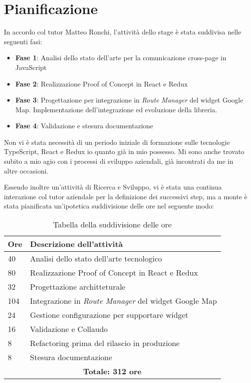 \section{Pianificazione}

In accordo col tutor Matteo Ronchi, l'attività dello stage è stata suddivisa nelle seguenti fasi:

\begin{itemize}
    \item \textbf{Fase 1}: Analisi dello stato dell'arte per la comunicazione cross-page in JavaScript
    \item \textbf{Fase 2}: Realizzazione Proof of Concept in React e Redux
    \item \textbf{Fase 3}: Progettazione per integrazione in \textit{Route Manager} del widget Google Map. Implementazione dell'integrazione ed evoluzione della libreria.
    \item \textbf{Fase 4}: Validazione e stesura documentazione
\end{itemize}

Non vi è stata necessità di un periodo iniziale di formazione sulle tecnologie TypeScript, React e Redux io quanto già in mio possesso. Mi sono anche trovato subito a mio agio con i processi di sviluppo aziendali, già incontrati da me in altre occasioni.

Essendo inoltre un'attività di Ricerca e Sviluppo, vi è stata una continua interazione col tutor aziendale per la definizione dei successivi step, ma a monte è stata pianificata un'ipotetica suddivisione delle ore nel seguente modo: \\

\begin{table}[!h]
\begin{tabular}{ |p{2cm} |p{10cm}|}
\hline
\textbf{Ore} & \textbf{Descrizione dell'attività} \\ \hline

40 & Analisi dello stato dell'arte tecnologico \\ \hline
80 & Realizzazione Proof of Concept in React e Redux \\ \hline
32 & Progettazione architteturale \\ \hline
104 & Integrazione in \textit{Route Manager} del widget Google Map \\ \hline
24 & Gestione configurazione per supportare widget \\ \hline
16 & Validazione e Collaudo \\ \hline
8 & Refactoring prima del rilascio in produzione \\ \hline
8 & Stesura documentazione \\ \hline

\multicolumn{2}{|c|}{\textbf{Totale: 312 ore}} \\ \hline

\end{tabular}
\caption{Tabella della suddivisione delle ore}
\end{table}

